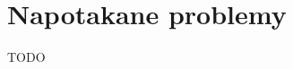 \documentclass[../main.tex]{subfiles}
\begin{document}
	
	
\section{Napotakane problemy}

TODO
\end{document}
